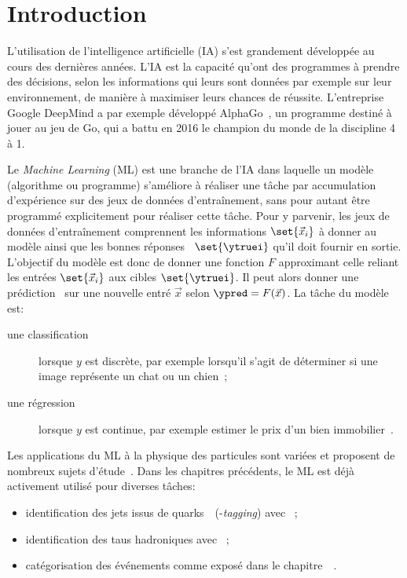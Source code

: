 \section{Introduction}\label{chapter-ML-section-intro}
L'utilisation de l'intelligence artificielle (IA) s'est grandement développée au cours des dernières années.
L'IA est la capacité qu'ont des programmes à prendre des décisions, selon les informations qui leurs sont données par exemple sur leur environnement, de manière à maximiser leurs chances de réussite.
L'entreprise Google DeepMind a par exemple développé AlphaGo~\cite{alphago},
un programme destiné à jouer au jeu de Go,
qui a battu en 2016 le champion du monde de la discipline 4 à 1.
\par
Le \emph{Machine Learning} (ML) est une branche de l'IA
dans laquelle un modèle (algorithme ou programme) s'améliore à réaliser une tâche par
accumulation d'expérience sur des jeux de données d'entraînement,
sans pour autant être programmé explicitement pour réaliser cette tâche.
Pour y parvenir,
les jeux de données d'entraînement comprennent les informations $\set{\vec{x}_i}$ à donner au modèle
ainsi que les \og bonnes réponses \fg\ $\set{\ytruei}$ qu'il doit fournir en sortie.
L'objectif du modèle est donc de donner une fonction $F$ approximant celle reliant les entrées $\set{\vec{x}_i}$ aux cibles $\set{\ytruei}$.
Il peut alors donner une prédiction \ypred\ sur une nouvelle entré $\vec{x}$ selon $\ypred=F(\vec{x})$.
La tâche du modèle est:
\begin{description}
\item[une classification] lorsque $y$ est discrète, par exemple lorsqu'il s'agit de déterminer si une image représente un chat ou un chien~\cite{datafrog_img_reco};
\item[une régression] lorsque $y$ est continue, par exemple estimer le prix d'un bien immobilier~\cite{house_prices_regression}.
\end{description}
\par
Les applications du ML à la physique des particules sont variées et proposent de nombreux sujets d'étude~\cite{Gael_thesis,scham_moritz_2020_21993,kopf_tanja_2019_21500,Baldi_2015}.
Dans les chapitres précédents, le ML est déjà activement utilisé pour diverses tâches:
\begin{itemize}
\item identification des jets issus de quarks~\quarkb\ (\quarkb-\emph{tagging}) avec \DeepCSV~\cite{jet_flavor_deep_nn,Sirunyan_heavy_flavor_jets_2018,DeepJet};
\item identification des taus hadroniques avec \DEEPTAU~\cite{CMS-DP-2019-033};
\item catégorisation des événements comme exposé dans le chapitre~~\cite{CMS-NOTE-2019-177,CMS-NOTE-2019-178}.
\end{itemize}
